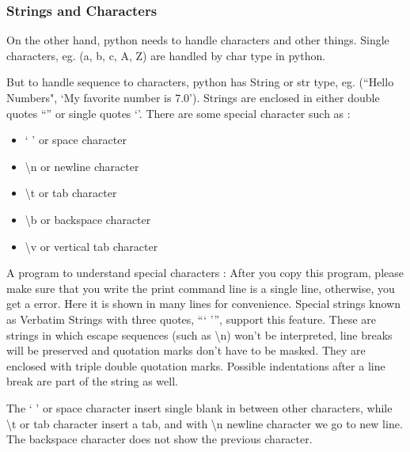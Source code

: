 \subsubsection{Strings and Characters}

On the other hand, python needs to handle characters and other things. Single characters, eg. (a, b, c, A, Z) are handled
by {\color{cyan} char} type in python.

But to handle sequence to characters, python has String or {\color{cyan} str} type, eg. (``Hello Numbers", `My favorite number is 7.0'). Strings are enclosed in either
double quotes ``'' or single quotes `'. There are some special character such as :

\begin{itemize}
\item ` ' or space character
\item \textbackslash n or newline character
\item \textbackslash t or tab character
\item \textbackslash b or backspace character
\item \textbackslash v or vertical tab character
\end{itemize}

A program to understand special characters :
After you copy this program, please make sure that you write the print command line is a single line, otherwise, you get a error. Here it is shown in many lines for convenience.
Special strings known as {\color{cyan} Verbatim Strings} with three quotes, ``` ''', support this feature.  These are strings in which escape sequences (such as \textbackslash n) won't be interpreted, line breaks will be preserved and quotation marks don't have to be masked. They are enclosed with triple double quotation marks. Possible indentations after a line break are part of the string as well.


The ` ' or space character insert single blank in between other characters, while \textbackslash t or tab character insert a tab, and with \textbackslash n newline character
we go to new line. The backspace character does not show the previous character.

